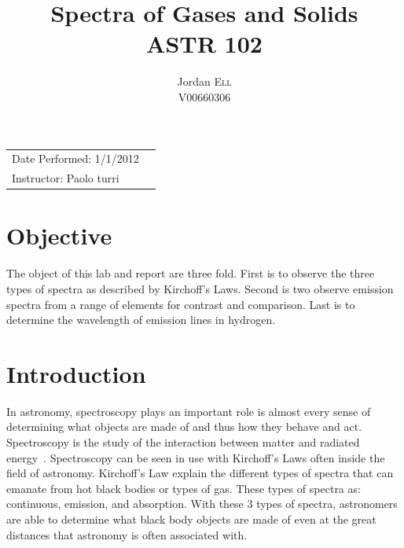 \documentclass{article}
\title{Spectra of Gases and Solids \\ ASTR 102} %
\author{Jordan \textsc{Ell} \\ V00660306} %
\begin{document}
\maketitle %

\begin{tabular}{lr}
Date Performed: 1/1/2012\\ %
Instructor: Paolo turri %
\end{tabular}

\setlength\parindent{0pt} %

\renewcommand{\labelenumi}{\alph{enumi}.} %


\section{Objective}

The object of this lab and report are three fold. First is to observe the three
types of spectra as described by Kirchoff's Laws. Second is two observe emission 
spectra from a range of elements for contrast and comparison. Last is to determine
the wavelength of emission lines in hydrogen.
 

\section{Introduction}

In astronomy, spectroscopy plays an important role is almost every sense of determining
what objects are made of and thus how they behave and act. Spectroscopy is the
study of the interaction between matter and radiated energy~\cite{Crouch:2007}.
Spectroscopy can be seen in use with Kirchoff's Laws often inside the field of
astronomy. Kirchoff's Law explain the different types of spectra that can emanate from
hot black bodies or types of gas. These types of spectra as: continuous, emission,
and absorption. With these 3 types of spectra, astronomers are able to determine
what black body objects are made of even at the great distances that astronomy is often
associated with.\\
\end{document}

